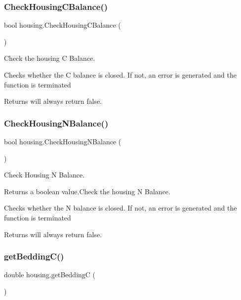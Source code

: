 \subsubsection{\texorpdfstring{CheckHousingCBalance()}{CheckHousingCBalance()}}
{\footnotesize\ttfamily bool housing.\+Check\+Housing\+C\+Balance (\begin{DoxyParamCaption}{ }\end{DoxyParamCaption})\hspace{0.3cm}{\ttfamily [inline]}}



Check the housing C Balance. 

Checks whether the C balance is closed. If not, an error is generated and the function is terminated \begin{DoxyReturn}{Returns}
will always return false. 
\end{DoxyReturn}
\mbox{\label{classhousing_af5df42adc33faded1ac9814881629c85}} 
\subsubsection{\texorpdfstring{CheckHousingNBalance()}{CheckHousingNBalance()}}
{\footnotesize\ttfamily bool housing.\+Check\+Housing\+N\+Balance (\begin{DoxyParamCaption}{ }\end{DoxyParamCaption})\hspace{0.3cm}{\ttfamily [inline]}}



Check Housing N Balance. 

\begin{DoxyReturn}{Returns}
a boolean value.\+Check the housing N Balance.
\end{DoxyReturn}
Checks whether the N balance is closed. If not, an error is generated and the function is terminated \begin{DoxyReturn}{Returns}
will always return false. 
\end{DoxyReturn}
\mbox{\label{classhousing_a75970a10d0af75df797cd4bb98c8c058}} 
\subsubsection{\texorpdfstring{getBeddingC()}{getBeddingC()}}
{\footnotesize\ttfamily double housing.\+get\+BeddingC (\begin{DoxyParamCaption}{ }\end{DoxyParamCaption})\hspace{0.3cm}{\ttfamily [inline]}}



